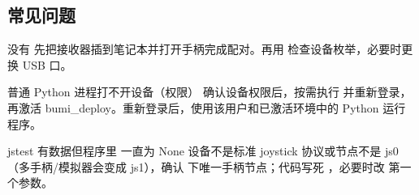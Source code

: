 \subsection*{常见问题}
\begin{faq}{没有 }
先把接收器插到笔记本并打开手柄完成配对。再用  检查设备枚举，必要时更换 USB 口。
\end{faq}
\begin{faq}{普通 Python 进程打不开设备（权限）}
确认设备权限后，按需执行  并重新登录，再激活 bumi\_deploy。重新登录后，使用该用户和已激活环境中的 Python 运行程序。
\end{faq}
\begin{faq}{jstest 有数据但程序里  一直为 None}
设备不是标准 joystick 协议或节点不是 js0（多手柄/模拟器会变成 js1），确认  下唯一手柄节点；代码写死 ，必要时改  第一个参数。
\end{faq}
